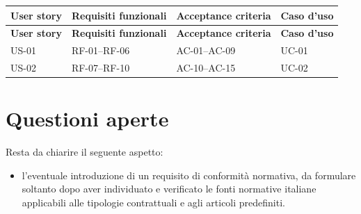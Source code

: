 \documentclass[12pt,a4paper]{article}
\begin{document}
\begin{longtable}{>{\raggedright\arraybackslash}p{2cm}
                  >{\raggedright\arraybackslash}p{5cm}
                  >{\raggedright\arraybackslash}p{4cm}
                  >{\raggedright\arraybackslash}p{2.5cm}}
\toprule
\textbf{User story} & \textbf{Requisiti funzionali} & \textbf{Acceptance criteria} &
\textbf{Caso d'uso} \\
\midrule
\endfirsthead

\toprule
\textbf{User story} & \textbf{Requisiti funzionali} & \textbf{Acceptance criteria} &
\textbf{Caso d'uso} \\
\midrule
\endhead

US-01 & RF-01--RF-06 & AC-01--AC-09 & UC-01 \\
US-02 & RF-07--RF-10 & AC-10--AC-15 & UC-02 \\

\bottomrule
\end{longtable}

\section{Questioni aperte}

Resta da chiarire il seguente aspetto:

\begin{itemize}
    \item l'eventuale introduzione di un requisito di conformità normativa, da formulare
          soltanto dopo aver individuato e verificato le fonti normative italiane applicabili
          alle tipologie contrattuali e agli articoli predefiniti.
\end{itemize}
\end{document}
